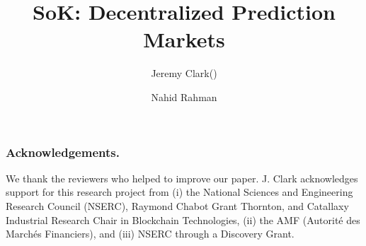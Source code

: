 \documentclass[runningheads]{llncs}
\begin{document}
\title{\Large \bf SoK: Decentralized Prediction Markets}

\author{
	Jeremy Clark(\Letter) \and 
	Nahid Rahman
	}


\maketitle









\subsubsection*{Acknowledgements.} We thank the reviewers who helped to improve our paper. J. Clark acknowledges support for this research project from (i) the National Sciences and Engineering Research Council (NSERC), Raymond Chabot Grant Thornton, and Catallaxy Industrial Research Chair in Blockchain Technologies, (ii) the AMF (Autorité des Marchés Financiers), and (iii) NSERC through a Discovery Grant. 





\clearpage
\appendix
\end{document}
